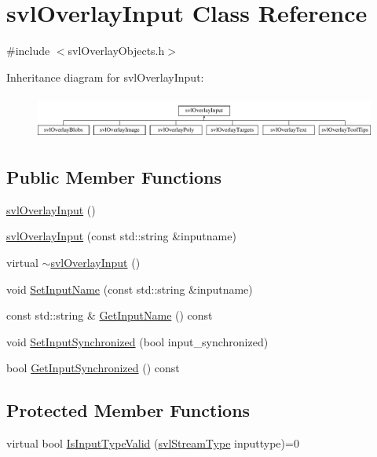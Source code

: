 \hypertarget{classsvl_overlay_input}{}\section{svl\+Overlay\+Input Class Reference}
\label{classsvl_overlay_input}


{\ttfamily \#include $<$svl\+Overlay\+Objects.\+h$>$}

Inheritance diagram for svl\+Overlay\+Input\+:\begin{figure}[H]
\begin{center}
\leavevmode
\includegraphics[height=1.447028cm]{d8/dc9/classsvl_overlay_input}
\end{center}
\end{figure}
\subsection*{Public Member Functions}
\begin{DoxyCompactItemize}
\item 
\hyperlink{classsvl_overlay_input_a752be26953e3d757b115eaa63acfcd13}{svl\+Overlay\+Input} ()
\item 
\hyperlink{classsvl_overlay_input_afc6d5bc44367183a4aa2164c0eda08a0}{svl\+Overlay\+Input} (const std\+::string \&inputname)
\item 
virtual \hyperlink{classsvl_overlay_input_a029c1a43a098b13b94cc7946b2cee183}{$\sim$svl\+Overlay\+Input} ()
\item 
void \hyperlink{classsvl_overlay_input_ad89bc67fa2bd806935da29c0495eafed}{Set\+Input\+Name} (const std\+::string \&inputname)
\item 
const std\+::string \& \hyperlink{classsvl_overlay_input_a3983146471136e7a4ff51b408b93e04c}{Get\+Input\+Name} () const 
\item 
void \hyperlink{classsvl_overlay_input_a273736f75670296898ebf854baac6021}{Set\+Input\+Synchronized} (bool input\+\_\+synchronized)
\item 
bool \hyperlink{classsvl_overlay_input_ab02133532556e003fbfdbab46540f5d5}{Get\+Input\+Synchronized} () const 
\end{DoxyCompactItemize}
\subsection*{Protected Member Functions}
\begin{DoxyCompactItemize}
\item 
virtual bool \hyperlink{classsvl_overlay_input_a8b5f017395cf28ad9cad02bfc1d3c0e3}{Is\+Input\+Type\+Valid} (\hyperlink{svl_definitions_8h_aa00696d338a58db361335a01fd11e122}{svl\+Stream\+Type} inputtype)=0
\end{DoxyCompactItemize}
